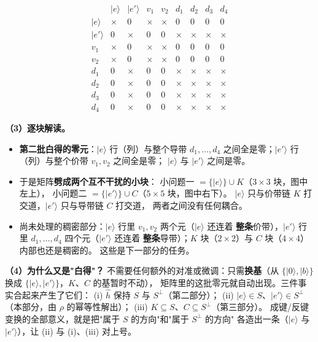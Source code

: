 \documentclass[11pt]{ctexart}
\begin{document}
\[
\begin{array}{c|cccccccc}
 & |e\rangle & |e'\rangle & v_1 & v_2 & d_1 & d_2 & d_3 & d_4\\[2pt]
\hline
|e\rangle & \times & 0 & \times & \times & 0 & 0 & 0 & 0\\[2pt]
|e'\rangle & 0 & \times & 0 & 0 & \times & \times & \times & \times\\[2pt]
v_1 & \times & 0 & \times & \times & 0 & 0 & 0 & 0\\[2pt]
v_2 & \times & 0 & \times & \times & 0 & 0 & 0 & 0\\[2pt]
d_1 & 0 & \times & 0 & 0 & \times & \times & \times & \times\\[2pt]
d_2 & 0 & \times & 0 & 0 & \times & \times & \times & \times\\[2pt]
d_3 & 0 & \times & 0 & 0 & \times & \times & \times & \times\\[2pt]
d_4 & 0 & \times & 0 & 0 & \times & \times & \times & \times
\end{array}
\]

\textbf{（3）逐块解读。}

\begin{itemize}
\item \textbf{第二批白得的零元}：$|e\rangle$ 行（列）与整个导带 $d_1,\dots,d_4$
之间全是零；$|e'\rangle$ 行（列）与整个价带 $v_1,v_2$ 之间全是零；
$|e\rangle$ 与 $|e'\rangle$ 之间是零。
\item 于是矩阵\textbf{劈成两个互不干扰的小块}：
小问题一 $=\{|e\rangle\}\cup K$（$3\times3$ 块，图中左上），
小问题二 $=\{|e'\rangle\}\cup C$（$5\times5$ 块，图中右下）。
$|e\rangle$ 只与价带链 $K$ 打交道，$|e'\rangle$ 只与导带链 $C$ 打交道，
两者之间没有任何耦合。
\item 尚未处理的稠密部分：$|e\rangle$ 行里 $v_1,v_2$ 两个元（$|e\rangle$ 还连着
\textbf{整条}价带），$|e'\rangle$ 行里 $d_1,\dots,d_4$ 四个元（$|e'\rangle$ 还连着
\textbf{整条}导带）；$K$ 块（$2\times2$）与 $C$ 块（$4\times4$）内部也还是稠密的。
这些是下一部分的任务。
\end{itemize}

\textbf{（4）为什么又是"白得"？}
不需要任何额外的对准或微调：只需\textbf{换基}（从 $\{|0\rangle,|b\rangle\}$
换成 $\{|e\rangle,|e'\rangle\}$，$K$、$C$ 的基暂时不动），
矩阵里的这批零元就自动出现。三件事实合起来产生了它们：
(i) $\hat h$ 保持 $S$ 与 $S^{\perp}$（第二部分）；
(ii) $|e\rangle\in S$、$|e'\rangle\in S^{\perp}$（本部分，由 $\rho$ 的幂等性解出）；
(iii) $K\subseteq S$、$C\subseteq S^{\perp}$（第三部分）。
成键/反键变换的全部意义，就是把"属于 $S$ 的方向"和"属于 $S^{\perp}$ 的方向"
各造出一条（$|e\rangle$ 与 $|e'\rangle$），让 (ii) 与 (i)、(iii) 对上号。
\end{document}
